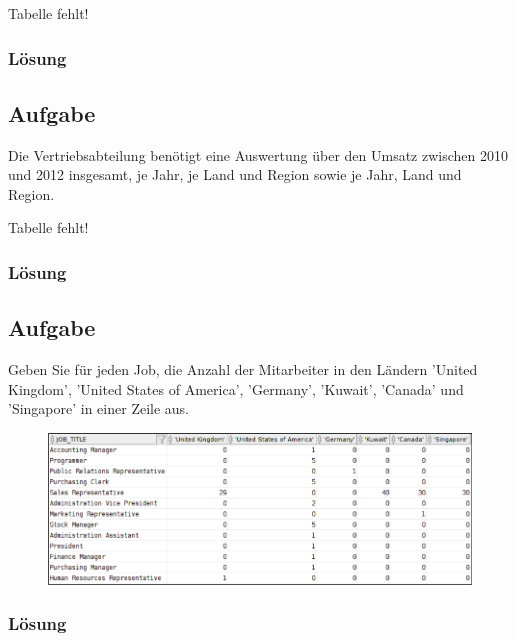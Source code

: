 \begin{WARN}
 Tabelle fehlt!
\end{WARN}

\subsubsection*{Lösung}
\label{subsubsec:uebung_06.aufgabe_02.loesung}


\label{subsec:uebung_06.aufgabe_03}
\subsection{Aufgabe}
Die Vertriebsabteilung benötigt eine Auswertung über den Umsatz zwischen 2010 und 2012 insgesamt, je Jahr, je Land und Region sowie je Jahr, Land und Region.

\begin{WARN}
 Tabelle fehlt!
\end{WARN}

\subsubsection*{Lösung}
\label{subsubsec:uebung_06.aufgabe_03.loesung}


\label{subsec:uebung_06.aufgabe_04}
\subsection{Aufgabe}
Geben Sie für jeden Job, die Anzahl der Mitarbeiter in den Ländern 'United Kingdom', 'United States of America', 'Germany', 'Kuwait', 'Canada' und 'Singapore' in einer Zeile aus.

\begin{figure}[H]
  \centering
  \includegraphics[width=1\textwidth]{img//uebung_06_-_aufgabe_04.png}
  \label{img:uebung_06_-_aufgabe_04}
\end{figure} 

\subsubsection*{Lösung}
\label{subsubsec:uebung_06.aufgabe_04.loesung}

